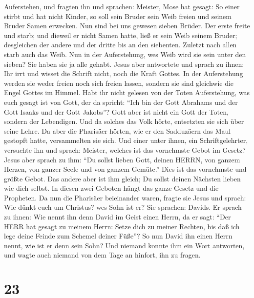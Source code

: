 Auferstehen, und fragten ihn  und sprachen: Meister, Mose
hat gesagt: So einer stirbt und hat nicht Kinder, so soll sein Bruder
sein Weib freien und seinem Bruder Samen erwecken.  Nun
sind bei uns gewesen sieben Brüder. Der erste freite und starb; und
dieweil er nicht Samen hatte, ließ er sein Weib seinem Bruder;
 desgleichen der andere und der dritte bis an den
siebenten.  Zuletzt nach allen starb auch das Weib.
 Nun in der Auferstehung, wes Weib wird sie sein unter den
sieben? Sie haben sie ja alle gehabt.  Jesus aber
antwortete und sprach zu ihnen: Ihr irrt und wisset die Schrift nicht,
noch die Kraft Gottes.  In der Auferstehung werden sie
weder freien noch sich freien lassen, sondern sie sind gleichwie die
Engel Gottes im Himmel.  Habt ihr nicht gelesen von der
Toten Auferstehung, was euch gesagt ist von Gott, der da spricht:
 ``Ich bin der Gott Abrahams und der Gott Isaaks und der
Gott Jakobs''? Gott aber ist nicht ein Gott der Toten, sondern der
Lebendigen.  Und da solches das Volk hörte, entsetzten sie
sich über seine Lehre.  Da aber die Pharisäer hörten, wie
er den Sadduzäern das Maul gestopft hatte, versammelten sie sich.
 Und einer unter ihnen, ein Schriftgelehrter, versuchte ihn
und sprach:  Meister, welches ist das vornehmste Gebot im
Gesetz?  Jesus aber sprach zu ihm: ``Du sollst lieben Gott,
deinen HERRN, von ganzem Herzen, von ganzer Seele und von ganzem
Gemüte.''  Dies ist das vornehmste und größte Gebot.
 Das andere aber ist ihm gleich; Du sollst deinen Nächsten
lieben wie dich selbst.  In diesen zwei Geboten hängt das
ganze Gesetz und die Propheten.  Da nun die Pharisäer
beieinander waren, fragte sie Jesus  und sprach: Wie dünkt
euch um Christus? wes Sohn ist er? Sie sprachen: Davids. 
Er sprach zu ihnen: Wie nennt ihn denn David im Geist einen Herrn, da er
sagt:  ``Der HERR hat gesagt zu meinem Herrn: Setze dich zu
meiner Rechten, bis daß ich lege deine Feinde zum Schemel deiner Füße''?
 So nun David ihn einen Herrn nennt, wie ist er denn sein
Sohn?  Und niemand konnte ihm ein Wort antworten, und wagte
auch niemand von dem Tage an hinfort, ihn zu fragen.

\hypertarget{section-22}{%
\section{23}\label{section-22}}

